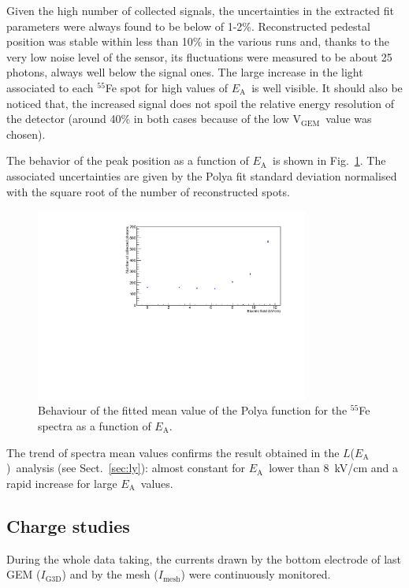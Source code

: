 \documentclass[a4paper,11pt]{article}
\newcommand{\Ig}  {$I_{\mathrm{G3D}}$}
\newcommand{\Ime}  {$I_{\mathrm{mesh}}$}
\newcommand{\Ea}  {$E_{\mathrm{A}}$}
\newcommand{\La}  {$L$(\Ea)}
\newcommand{\Vg}  {V$_{\mathrm{GEM}}$}
\begin{document}
Given the high number of collected signals, the uncertainties in the extracted fit parameters 
were always found to be below of 1-2\%. 
Reconstructed pedestal position was stable within less than 10\% in the various runs and, thanks to the very low noise level of the sensor, its fluctuations were measured to be about 25 photons, always well below the signal ones.
The large increase in the light associated to each $^{55}$Fe spot for high values of \Ea\ is well visible. 
It should also be noticed that, the increased signal does not spoil the relative energy resolution of the detector (around 40\% in both cases because of the low \Vg\ value was chosen). 

The behavior of the peak position as a function of \Ea\ is shown in Fig.~\ref{fig:qIn2}. 
The associated uncertainties are given by the Polya fit standard deviation normalised 
with the square root of the number of reconstructed spots.

\begin{figure}[ht]
\centering
\includegraphics[width=0.80\textwidth]{gqIn_corr.pdf}
\caption{Behaviour of the fitted mean value of the Polya function for the
$^{55}$Fe spectra as a 
function of \Ea.} 
\label{fig:qIn2}
\end{figure}

The trend of spectra mean values confirms the result obtained in the \La\ analysis (see Sect.~\ref{sec:ly}): almost constant for \Ea\ lower than 8~kV/cm and a rapid increase for large \Ea\ values.

\subsection{Charge studies}

During the whole data taking, the currents drawn by the bottom electrode of last GEM (\Ig) and by the mesh (\Ime) were continuously monitored. 
\end{document}
